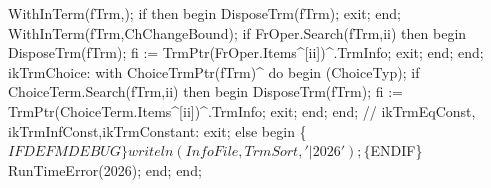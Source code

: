               WithInTerm(fTrm,);
              if  then
              begin
                 DisposeTrm(fTrm);
                 exit;
              end;
              WithInTerm(fTrm,ChChangeBound);
              if FrOper.Search(fTrm,ii) then
              begin
                 DisposeTrm(fTrm);
                 fi := TrmPtr(FrOper.Items^[ii])^.TrmInfo;
                 exit;
              end;
           end;
        ikTrmChoice:
           with ChoiceTrmPtr(fTrm)^ do
           begin
              (ChoiceTyp);
              if ChoiceTerm.Search(fTrm,ii) then
              begin
                 DisposeTrm(fTrm);
                 fi := TrmPtr(ChoiceTerm.Items^[ii])^.TrmInfo;
                 exit;
              end;
           end;
        //    ikTrmEqConst,
        ikTrmInfConst,ikTrmConstant:
        exit;
      else
      begin
         \{$IFDEF MDEBUG\}
         writeln(InfoFile,TrmSort,'|2026');
         \{$ENDIF\}
         RunTimeError(2026);
      end;
   end;
   
